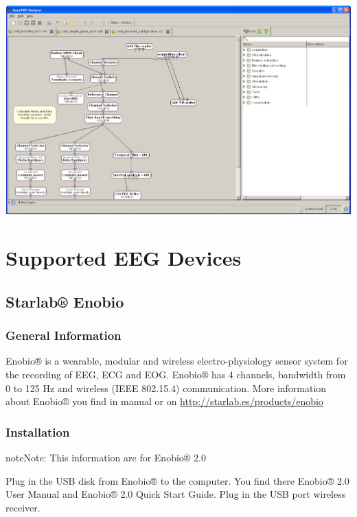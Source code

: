 \documentclass[letterpaper,10pt,english]{sphinxmanual}
\begin{document}
{\hfill\includegraphics{OpenvibeDesinger.PNG}\hfill}


\section{\textbf{Supported EEG Devices}}
\label{index:id3}\label{index:supported-eeg-devices}

\subsection{\textbf{Starlab® Enobio}}
\label{index:starlab-enobio}

\subsubsection{General Information}
\label{index:general-information}
Enobio® is a wearable, modular and wireless electro-physiology sensor system for the recording of EEG, ECG and EOG. Enobio® has 4 channels, bandwidth from 0 to 125 Hz and wireless (IEEE 802.15.4) communication. More information about Enobio® you find in manual or on \href{http://starlab.es/products/enobio}{http://starlab.es/products/enobio}


\subsubsection{Installation}
\label{index:id4}
\begin{notice}{note}{Note:}
This information are for Enobio® 2.0
\end{notice}

Plug in the USB disk from Enobio® to the computer. You find there Enobio® 2.0 User Manual and Enobio® 2.0 Quick Start Guide. Plug in the USB port wireless receiver.
\end{document}
